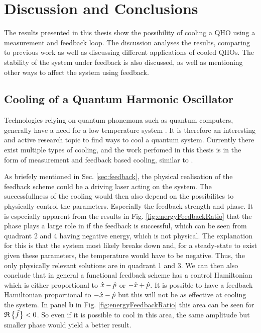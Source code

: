 \section{Discussion and Conclusions}
The results presented in this thesis show the possibility of cooling a QHO using a measurement and feedback loop. The discussion analyses the results, comparing to previous work as well as discussing different applications of cooled QHOs. The stability of the system under feedback is also discussed, as well as mentioning other ways to affect the system using feedback. 

\subsection{Cooling of a Quantum Harmonic Oscillator}
Technologies relying on quantum phonemona such as quantum computers, generally have a need for a low temperature system \cite{Nielsen:2010}. It is therefore an interesting and active research topic to find ways to cool a quantum system. Currently there exist multiple types of cooling, and the work perfomed in this thesis is in the form of measurement and feedback based cooling, similar to \cite{De-Sousa:2025}.

As briefely mentioned in Sec. \ref{sec:feedback}, the physical realisation of the feedback scheme could be a driving laser acting on the system. The successfullness of the cooling would then also depend on the possibilites to physically control the parameters. Especially the feedback strength and phase. It is especially apparent from the results in Fig. \ref{fig:energyFeedbackRatio} that the phase plays a large role in if the feedback is successful, which can be seen from quadrant 2 and 4 having negative energy, which is not physical. The explanation for this is that the system most likely breaks down and, for a steady-state to exist given these parameters, the temperature would have to be negative. Thus, the only physically relevant solutions are in quadrant 1 and 3. We can then also conclude that in general a functional feedback scheme has a control Hamiltonian which is either proportional to $\hat{x} - \hat{p}$ or $-\hat{x} + \hat{p}$. It is possible to have a feedback Hamiltonian proportional to $-\hat{x} - \hat{p}$ but this will not be as effective at cooling the system. In panel \textbf{b} in Fig. \ref{fig:energyFeedbackRatio} this area can be seen for $\mathfrak{R}\left\{\tilde{f}\right\} < 0$. So even if it is possible to cool in this area, the same amplitude but smaller phase would yield a better result.

